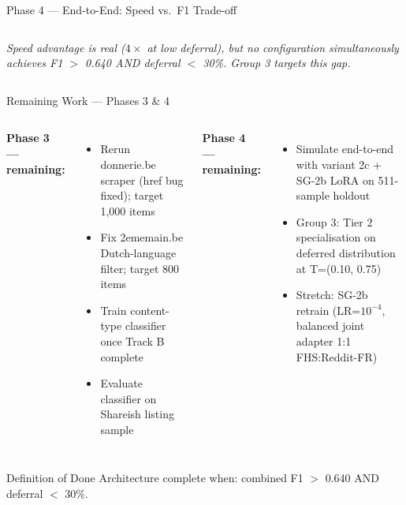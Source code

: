 \documentclass[aspectratio=169, 12pt]{beamer}
\begin{document}
\begin{frame}[shrink=30]{Phase 4 --- End-to-End: Speed vs.\ F1 Trade-off}
\begin{columns}[T]
      \vspace{6pt}
      \small\textit{Speed advantage is real ($4\times$ at low deferral), but no configuration
      simultaneously achieves F1 $>$ 0.640 AND deferral $<$ 30\%. Group 3 targets this gap.}
  \end{columns}
\end{frame}

\begin{frame}[shrink=20]{Remaining Work --- Phases 3 \& 4}
  \begin{columns}[T]
      \textbf{Phase 3 --- remaining:}
      \begin{itemize}
        \item Rerun donnerie.be scraper (href bug fixed); target 1,000 items
        \item Fix 2ememain.be Dutch-language filter; target 800 items
        \item Train content-type classifier once Track B complete
        \item Evaluate classifier on Shareish listing sample
      \end{itemize}

      \textbf{Phase 4 --- remaining:}
      \begin{itemize}
        \item Simulate end-to-end with variant 2c + SG-2b LoRA on 511-sample holdout
        \item Group 3: Tier 2 specialisation on deferred distribution at T=(0.10, 0.75)
        \item Stretch: SG-2b retrain (LR=$10^{-4}$, balanced joint adapter 1:1 FHS:Reddit-FR)
      \end{itemize}
  \end{columns}

  \vspace{8pt}
  \begin{block}{Definition of Done}
    Architecture complete when: combined F1 $>$ 0.640 AND deferral $<$ 30\%.
  \end{block}
\end{frame}
\end{document}
